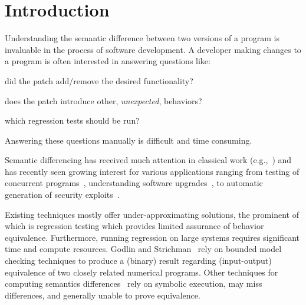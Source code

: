 \section{Introduction} 



Understanding the semantic difference between two versions of a program is invaluable in the process of software development. A developer making changes to a program is often interested in answering questions like:
\begin{inparaenum}[(i)]
\item did the patch add/remove the desired functionality?
\item does the patch introduce other, \emph{unexpected}, behaviors?
\item which regression tests should be run?
\end{inparaenum}
Answering these questions manually is difficult and time consuming.

Semantic differencing has received much attention in classical work (e.g.,~\cite{Horwitz90,Horwitz89,Hoare69}) and has recently seen growing interest for various applications ranging from testing of concurrent programs~\cite{ChakiGurfinkelStrichman12}, understanding software upgrades~\cite{JinOrsoXie10}, to automatic generation of security exploits~\cite{BrumleyPoosankamSongZheng08}.

Existing techniques mostly offer under-approximating solutions, the prominent of which is regression testing which provides limited assurance of behavior equivalence. Furthermore, running regression on large systems requires significant time and compute resources. Godlin and Strichman~\cite{GodlinStrichman09} rely on bounded model checking techniques to produce a (binary) result regarding (input-output) equivalence of two closely related numerical programs.
Other techniques for computing semantics differences~\cite{DwyerElbaumPerson08,EnglerRamos11} rely on
symbolic execution, may miss differences, and generally unable to prove equivalence.

